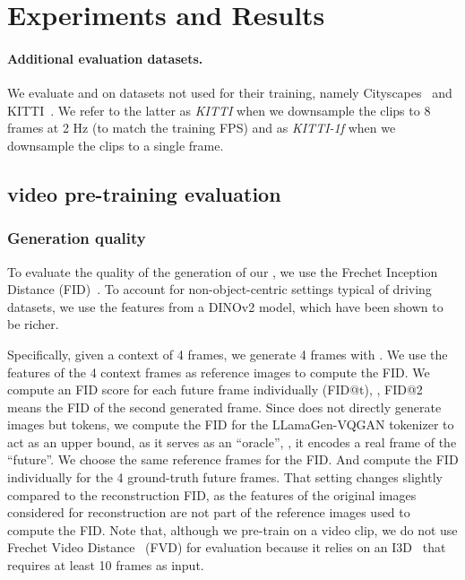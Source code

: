 \section{Experiments and Results}
\label{sec:exps_and_results}

\paragraph{Additional evaluation datasets.} We evaluate \vm{} and \vam on datasets not used for their training, namely Cityscapes~\cite{Cordts2016Cityscapes} and KITTI~\cite{geiger2013kitti}. We refer to the latter as \emph{KITTI} when we downsample the clips to 8 frames at 2 Hz (to match the training FPS) and as \emph{KITTI-1f} when we downsample the clips to a single frame.


\subsection{\vm{} video pre-training evaluation}

\subsubsection{Generation quality}



To evaluate the quality of the generation of our \vm, we use the Frechet Inception Distance (FID)~\cite{heusel2017fid}. To account for non-object-centric settings typical of driving datasets, we use the features from a DINOv2 model, which have been shown to be richer. 

Specifically, given a context of 4 frames, we generate 4 frames with \vm. We use the features of the 4 context frames as reference images to compute the FID. We compute an FID score for each future frame individually (FID@t), \ie, FID@2 means the FID of the second generated frame. Since \vm does not directly generate images but tokens, we compute the FID for the LLamaGen-VQGAN tokenizer to act as an upper bound, as it serves as an ``oracle'', \ie, it encodes a real frame of the ``future''. We choose the same reference frames for the FID. And compute the FID individually for the 4 ground-truth future frames.
That setting changes slightly compared to the reconstruction FID, as the features of the original images considered for reconstruction are not part of the reference images used to compute the FID.
Note that, although we pre-train on a video clip, we do not use Frechet Video Distance~\cite{Unterthiner2019FVD} (FVD) for evaluation because it relies on an I3D~\cite{I3D} that requires at least 10 frames as input.

